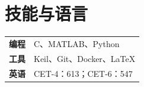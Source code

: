 \documentclass[10pt,a4paper]{article}
\begin{document}
\section{技能与语言}
\begin{tabularx}{\linewidth}{@{}p{23mm}X@{}}
\textbf{编程} & C、MATLAB、Python\\[3pt]
\textbf{工具} & Keil、Git、Docker、\LaTeX\\[3pt]
\textbf{英语} & CET-4：613；CET-6：547
\end{tabularx}
\end{document}
